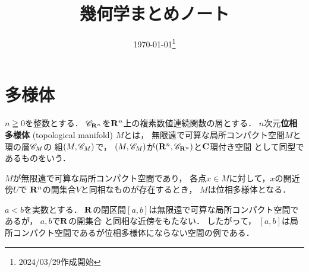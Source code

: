 \renewcommand{\Re}{\mathop{\mathrm{Re}}\nolimits}







\def\inner<#1>{\langle #1 \rangle}








\title{幾何学まとめノート}
\date{\today\footnote{2024/03/29作成開始}}

\maketitle

\section{多様体}
\begin{leftbar}
\begin{DFN}[{\cite[\S\S 2.9.4]{KS90}}]
  \(n\geqq 0\)を整数とする．
  \(\mathscr{C}_{\mathbf{R}^n}\)を\(\mathbf{R}^n\)上の複素数値連続関数の層とする．
  \(n\)次元\textbf{位相多様体} (topological manifold) \(M\)とは，
  無限遠で可算な局所コンパクト空間\(M\)と環の層\(\mathscr{C}_M\)の
  組\((M,\mathscr{C}_M)\)で，
  \((M,\mathscr{C}_M)\)が\((\mathbf{R}^n,\mathscr{C}_{\mathbf{R}^n})\)と\(\mathbf{C}\)環付き空間
  として同型であるものをいう．
\end{DFN}
\end{leftbar}
\(M\)が無限遠で可算な局所コンパクト空間であり，
各点\(x\in M\)に対して，\(x\)の開近傍\(U\)で
\(\mathbf{R}^n\)の開集合\(V\)と同相なものが存在するとき，
\(M\)は位相多様体となる．

\begin{EG}
  \(a<b\)を実数とする．
  \(\mathbf{R}\)の閉区間\([a,b]\)は無限遠で可算な局所コンパクト空間であるが，
  \(a,b\)で\(\mathbf{R}\)の開集合
  と同相な近傍をもたない．
  したがって，
  \([a,b]\)は局所コンパクト空間であるが位相多様体にならない空間の例である．
\end{EG}
